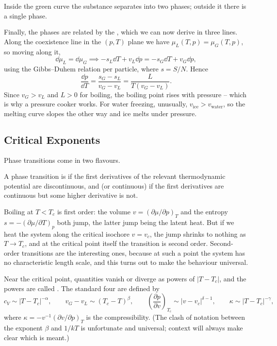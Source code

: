 Inside the green curve the substance separates into two phases; outside it there is a single phase.

Finally, the phases are related by the , which we can now derive in three lines. Along the coexistence line in the $(p,T)$ plane we have $\mu_L(T,p) = \mu_G(T,p)$, so moving along it,
$$
\dd \mu_L = \dd\mu_G \implies -s_L\dd T + v_L \dd p = -s_G\dd T + v_G\dd p,
$$
using the Gibbs--Duhem relation per particle, where $s = S/N$. Hence
$$
\frac{\dd p}{\dd T} = \frac{s_G - s_L}{v_G - v_L} = \frac{L}{T(v_G-v_L)}.
$$
Since $v_G > v_L$ and $L > 0$ for boiling, the boiling point rises with pressure -- which is why a pressure cooker works. For water freezing, unusually, $v_{\mathrm{ice}} > v_{\mathrm{water}}$, so the melting curve slopes the other way and ice melts under pressure.

\subsection{Critical Exponents}\label{sec:critexp}

Phase transitions come in two flavours.

\begin{definition}
	A phase transition is  if the first derivatives of the relevant thermodynamic potential are discontinuous, and  (or continuous) if the first derivatives are continuous but some higher derivative is not.
\end{definition}

Boiling at $T < T_c$ is first order: the volume $v = (\partial\mu/\partial p)_T$ and the entropy $s = -(\partial\mu/\partial T)_p$ both jump, the latter jump being the latent heat. But if we heat the system along the critical isochore $v = v_c$, the jump shrinks to nothing as $T \to T_c$, and at the critical point itself the transition is second order. Second-order transitions are the interesting ones, because at such a point the system has no characteristic length scale, and this turns out to make the behaviour universal.

Near the critical point, quantities vanish or diverge as powers of $|T - T_c|$, and the powers are called . The standard four are defined by
$$
c_V \sim |T - T_c|^{-\alpha}, \qquad v_G - v_L \sim (T_c - T)^{\beta}, \qquad \left(\frac{\partial p}{\partial v}\right)_{T_c} \sim |v-v_c|^{\delta - 1}, \qquad \kappa \sim |T-T_c|^{-\gamma},
$$
where $\kappa = -v^{-1}(\partial v/\partial p)_T$ is the compressibility. (The clash of notation between the exponent $\beta$ and $1/kT$ is unfortunate and universal; context will always make clear which is meant.)

